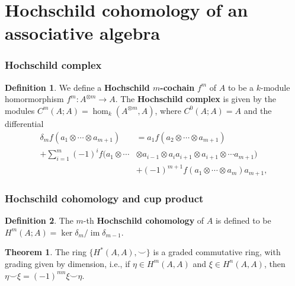 \documentclass{beamer}
\theoremstyle{definition}
\newtheorem{teorema}{Theorem}
\newtheorem{defi}{Definition}
\DeclareMathOperator{\im}{im}
\begin{document}
\section{Hochschild cohomology of an associative algebra}
\begin{frame}
	\frametitle{Hochschild complex}
	\begin{defi}
	 We define a \textbf{Hochschild $m$-cochain} $f^m$ of $A$ to be a $k$-module homormorphism $f^m: A^{\otimes m}\to A$. The \textbf{Hochschild complex} is given by the modules $C^m(A;A)=\hom_k(A^{\otimes m}, A)$, where $C^0(A;A)=A$ and the differential
	 \begin{align*}
	 \delta_m f(a_1\otimes\cdots\otimes a_{m+1})&=a_1f(a_2\otimes\cdots\otimes a_{m+1})\\
	  +\sum_{i=1}^m(-1)^if(a_1\otimes\cdots&\otimes a_{i-1}\otimes a_ia_{i+1}\otimes a_{i+1}\otimes\cdots a_{m+1})\\
	 & +(-1)^{m+1}f(a_1\otimes\cdots\otimes a_m)a_{m+1},
	 \end{align*}
	 \end{defi}
\end{frame}

\begin{frame}
	\frametitle{Hochschild cohomology and cup product}
	\begin{defi}
		The $m$-th \textbf{Hochschild cohomology} of $A$ is defined to be $H^m(A;A)=\ker\delta_m/\im\delta_{m-1}$.
		\end{defi}\pause
	
	\begin{teorema}
		The ring $\{H^*(A,A),\smile\}$ is a graded commutative ring, with grading given by dimension, i.e., if $\eta\in H^m(A,A)$ and $\xi\in H^n(A,A)$, then $\eta\smile \xi =(-1)^{mn}\xi\smile \eta$.
	\end{teorema} 
\end{frame}

%
%
\end{document}
